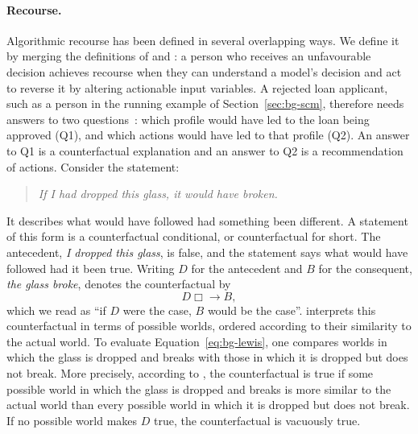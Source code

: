 \paragraph{Recourse.}
Algorithmic recourse has been defined in several overlapping ways. We define it by merging the definitions of
\citet{ustun2019actionable} and 
\citet{karimi2022survey}: a person who receives an unfavourable
decision achieves recourse when they can understand a model's decision and act to reverse it by altering
actionable input variables. A rejected
loan applicant, such as a person in the running example of Section~\ref{sec:bg-scm}, therefore
needs answers to two questions~\cite{karimi2022survey}: which profile would have led to the loan being approved (Q1), and
which actions would have led to that profile (Q2). An answer to Q1 is a counterfactual explanation
and an answer to Q2 is a recommendation of actions. Consider the statement:
\begin{quote}
  \emph{If I had dropped this glass, it would have broken.}
\end{quote}
It describes what would have followed had something been different. A statement of this form is a
counterfactual conditional, or counterfactual for short. The
antecedent, \emph{I dropped this glass}, is false, and the statement says what would have followed
had it been true. Writing $D$ for the antecedent and $B$ for the consequent, \emph{the glass broke},
\citet{lewis1973counterfactuals} denotes the counterfactual by
\begin{equation}
  D \mathrel{\Box\!\!\!\rightarrow} B,
  \label{eq:bg-lewis}
\end{equation}  
which we read as ``if $D$ were the case, $B$ would be the case''. \citet{lewis1973counterfactuals}
interprets this counterfactual in terms of possible worlds, ordered according 
to their similarity to the actual world. To evaluate Equation~\ref{eq:bg-lewis}, 
one compares worlds in which the glass is dropped and breaks with those in which 
it is dropped but does not break. More precisely, according to \citet[Analysis~3]{lewis1973counterfactuals},
the counterfactual is true if some possible world in which the glass is dropped and breaks 
is more similar to the actual world than every possible world in which it is dropped but 
does not break. If no possible world makes $D$ true, the counterfactual is vacuously true.

